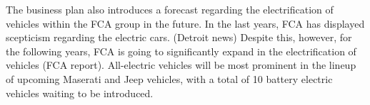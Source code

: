The business plan also introduces a forecast regarding the electrification of vehicles within the FCA group in the future. In the last years, FCA has displayed scepticism regarding the electric cars. (Detroit news) Despite this, however, for the following years, FCA is going to significantly expand in the electrification of vehicles (FCA report). All-electric vehicles will be most prominent in the lineup of upcoming Maserati and Jeep vehicles, with a total of 10 battery electric vehicles waiting to be introduced. 




